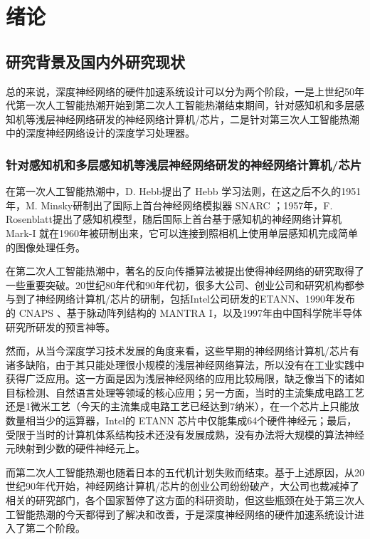 \chapter{绪论}\label{chap:preface}

\section{研究背景及国内外研究现状}

总的来说，深度神经网络的硬件加速系统设计可以分为两个阶段，一是上世纪50年代第一次人工智能热潮开始到第二次人工智能热潮结束期间，针对感知机和多层感知机等浅层神经网络研发的神经网络计算机/芯片，二是针对第三次人工智能热潮中的深度神经网络设计的深度学习处理器。

\subsection{针对感知机和多层感知机等浅层神经网络研发的神经网络计算机/芯片}

在第一次人工智能热潮中，D. Hebb提出了 Hebb 学习法则，在这之后不久的1951年，M. Minsky研制出了国际上首台神经网络模拟器 SNARC ；1957年，F. Rosenblatt提出了感知机模型，随后国际上首台基于感知机的神经网络计算机 Mark-I 就在1960年被研制出来，它可以连接到照相机上使用单层感知机完成简单的图像处理任务。

在第二次人工智能热潮中，著名的反向传播算法被提出使得神经网络的研究取得了一些重要突破。20世纪80年代和90年代初，很多大公司、创业公司和研究机构都参与到了神经网络计算机/芯片的研制，包括Intel公司研发的ETANN\cite{118698}、1990年发布的 CNAPS\cite{5726581} 、基于脉动阵列结构的 MANTRA I\cite{714364}，以及1997年由中国科学院半导体研究所研发的预言神\cite{人工神经网络硬件化途径与神经计算机研究}等。

然而，从当今深度学习技术发展的角度来看，这些早期的神经网络计算机/芯片有诸多缺陷，由于其只能处理很小规模的浅层神经网络算法，所以没有在工业实践中获得广泛应用。这一方面是因为浅层神经网络的应用比较局限，缺乏像当下的诸如目标检测、自然语言处理等领域的核心应用；另一方面，当时的主流集成电路工艺还是1微米工艺（今天的主流集成电路工艺已经达到7纳米），在一个芯片上只能放数量相当少的运算器，Intel的 ETANN 芯片中仅能集成64个硬件神经元；最后，受限于当时的计算机体系结构技术还没有发展成熟，没有办法将大规模的算法神经元映射到少数的硬件神经元上。

而第二次人工智能热潮也随着日本的五代机计划失败而结束。基于上述原因，从20世纪90年代开始，神经网络计算机/芯片的创业公司纷纷破产，大公司也裁减掉了相关的研究部门，各个国家暂停了这方面的科研资助，但这些瓶颈在处于第三次人工智能热潮的今天都得到了解决和改善，于是深度神经网络的硬件加速系统设计进入了第二个阶段。


